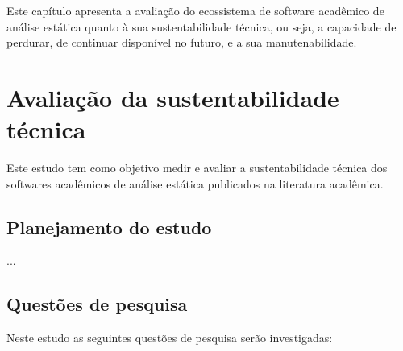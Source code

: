 {Este capítulo apresenta a avaliação do ecossistema de software acadêmico de
análise estática quanto à sua sustentabilidade técnica, ou seja, a capacidade
de perdurar, de continuar disponível no futuro, e a sua manutenabilidade.}

\section{Avaliação da sustentabilidade técnica}

\label{sustentabilidade-tecnica}



Este estudo tem como objetivo medir e avaliar a sustentabilidade técnica dos
softwares acadêmicos de análise estática publicados na literatura acadêmica.

\subsection{Planejamento do estudo}

...

\subsection{Questões de pesquisa}

Neste estudo as seguintes questões de pesquisa serão investigadas:

\newcommand{\QuestaoUm}{Na literatura científica publicada, como as taxas de
softwares publicados, no domínio de aplicação de análise estática, mudam ao
longo do tempo?}

\newcommand{\QuestaoDois}{Os softwares acadêmicos de análise estática, publicados
na literatura científica, estão disponíveis para obtenção hoje?}

\newcommand{\QuestaoTres}{Na literatura científica publicada, como as taxas de
softwares disponíveis, no domínio de aplicação de análise estática, mudam ao
longo do tempo?}

\newcommand{\QuestaoQuatro}{Podemos adaptar de forma incremental os softwares
acadêmicos de análise estática para aproveitar oportunidades emergentes, sem
perda de reprodutibilidade?}

